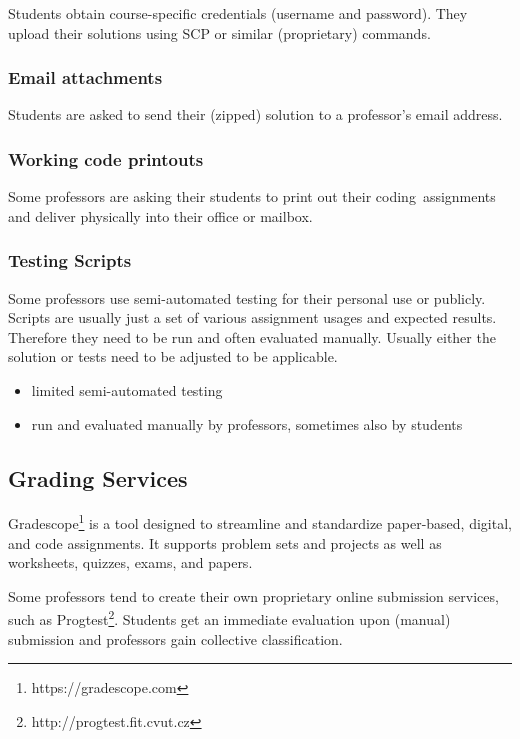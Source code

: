{Students obtain course-specific credentials (username and password). They upload their solutions using SCP or similar (proprietary) commands.}

\subsubsection{Email attachments}

{Students are asked to send their (zipped) solution to a professor's email address.}

\subsubsection{Working code printouts}

{Some professors are asking their students to print out their }{coding}{~assignments and deliver physically into their office or mailbox.}

\subsubsection{Testing Scripts}

{Some professors use semi-automated testing for their personal use or publicly. Scripts are usually just a set of various assignment usages and expected results. Therefore they need to be run and often evaluated manually. Usually either the solution or tests need to be adjusted to be applicable.}

\begin{itemize}
\item
  {limited semi-automated testing}
\item
  {run and evaluated manually by professors, sometimes also by students}
\end{itemize}

\subsection{Grading Services}

{Gradescope\footnote{https://gradescope.com} is a tool designed to streamline and standardize paper-based, digital, and code assignments. It supports problem sets and projects as well as worksheets, quizzes, exams, and papers.}

{Some professors tend to create their own proprietary online submission services, such as Progtest\footnote{http://progtest.fit.cvut.cz}. Students get an immediate evaluation upon (manual) submission and professors gain collective classification.}

